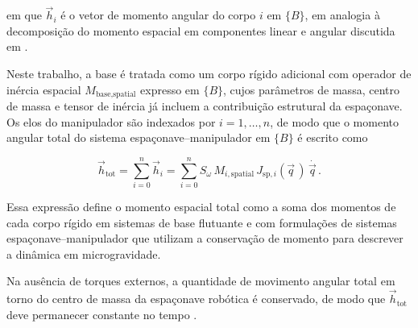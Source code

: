 em que $\vec h_i$ é o vetor de momento angular do corpo $i$ em $\{B\}$,
em analogia à decomposição do momento espacial em componentes linear e
angular discutida em \cite{featherstone2008,lynch2017modern}.

Neste trabalho, a base é tratada como um corpo rígido adicional com operador de inércia espacial
$M_{\text{base},\text{spatial}}$ expresso em $\{B\}$,
cujos parâmetros de massa, centro de massa e tensor de inércia já incluem
a contribuição estrutural da espaçonave.
Os elos do manipulador são indexados por $i=1,\dots,n$, de modo que o
momento angular total do sistema espaçonave--manipulador em $\{B\}$ é escrito como

\begin{equation}
\vec h_{\text{tot}}
=
\sum_{i=0}^{n} \vec h_i
=
\sum_{i=0}^{n}
S_\omega\,M_{i,\text{spatial}}\,
J_{\text{sp},i}(\vec q\,)\,\dot{\vec q\,}.
\end{equation}

Essa expressão define o momento espacial total como a soma dos momentos de cada corpo rígido
em sistemas de base flutuante \cite{featherstone2008} e com formulações de sistemas espaçonave--manipulador
que utilizam a conservação de momento para descrever a dinâmica em
microgravidade.

Na ausência de torques externos, a quantidade de movimento angular total em
torno do centro de massa da espaçonave robótica é conservado, de modo que
$\vec h_{\text{tot}}$ deve permanecer constante no tempo \cite{wie2008space,featherstone2008}.